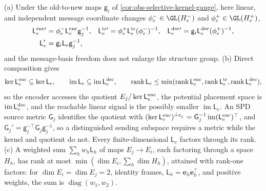 (a) Under the old-to-new maps \(\mathsf g_i\) of
\cref{cor:obs-selective-kernel-gauge}, here linear, and independent message
coordinate changes \(\phi_e^-\in\GL(H_e^-)\) and \(\phi_e^+\in\GL(H_e^+)\),
\begin{align}
\mathsf L^{\rm enc\prime}_e&=\phi_e^-\mathsf L^{\rm enc}_e\mathsf g_j^{-1},&
\mathsf L^{\rm tr\prime}_e&=\phi_e^+\mathsf L^{\rm tr}_e(\phi_e^-)^{-1},&
\mathsf L^{\rm dec\prime}_e&=\mathsf g_i\mathsf L^{\rm dec}_e(\phi_e^+)^{-1},\nonumber\\
\mathsf L_e'&=\mathsf g_i\mathsf L_e\mathsf g_j^{-1},
\label{eq:geo-selective-covariance}
\end{align}
and the message-basis freedom does not enlarge the structure group. (b) Direct
composition gives
\begin{equation}
\ker\mathsf L^{\rm enc}_e\subseteq\ker\mathsf L_e,\qquad
\operatorname{im}\mathsf L_e\subseteq\operatorname{im}\mathsf L^{\rm dec}_e,\qquad
\operatorname{rank}\mathsf L_e\leq
\min(\operatorname{rank}\mathsf L^{\rm enc}_e,\operatorname{rank}\mathsf L^{\rm tr}_e,
\operatorname{rank}\mathsf L^{\rm dec}_e),
\label{eq:geo-selective-rank}
\end{equation}
so the encoder accesses the quotient \(E_j/\ker\mathsf L^{\rm enc}_e\), the
potential placement space is \(\operatorname{im}\mathsf L^{\rm dec}_e\), and the
reachable linear signal is the possibly smaller \(\operatorname{im}\mathsf L_e\).
An SPD source metric \(\mathsf G_j\) identifies the quotient with
\((\ker\mathsf L^{\rm enc}_e)^{\perp_{\mathsf G_j}}
=\mathsf G_j^{-1}\operatorname{im}(\mathsf L^{\rm enc}_e)^\top\), and
\(\mathsf G_j'=\mathsf g_j^{-\top}\mathsf G_j\mathsf g_j^{-1}\), so a
distinguished sending subspace requires a metric while the kernel and quotient
do not. Every finite-dimensional \(\mathsf L_e\) factors through its rank. (c) A
weighted sum \(\sum_hw_h\mathsf L_h\) of maps \(E_j\to E_i\), each factoring
through a space \(H_h\), has rank at most \(\min(\dim E_i,\sum_h\dim H_h)\),
attained with rank-one factors: for \(\dim E_i=\dim E_j=2\), identity frames,
\(\mathsf L_h=\mathbf e_h\mathbf e_h^\top\), and positive weights, the sum is
\(\operatorname{diag}(w_1,w_2)\).

